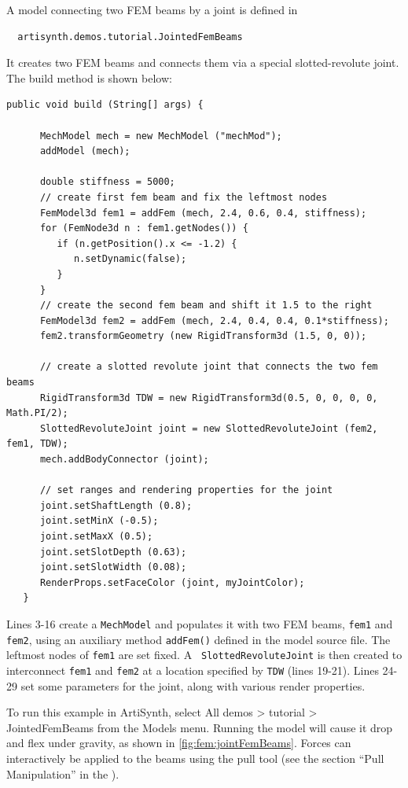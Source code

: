 A model connecting two FEM beams by a joint
is defined in
%
\begin{verbatim}
  artisynth.demos.tutorial.JointedFemBeams
\end{verbatim}
%
It creates two FEM beams and connects them via a special slotted-revolute
joint. The build method is shown below:
\lstset{numbers=left}
\begin{lstlisting}[]
   public void build (String[] args) {
      
      MechModel mech = new MechModel ("mechMod");
      addModel (mech);
      
      double stiffness = 5000;
      // create first fem beam and fix the leftmost nodes      
      FemModel3d fem1 = addFem (mech, 2.4, 0.6, 0.4, stiffness);
      for (FemNode3d n : fem1.getNodes()) {
         if (n.getPosition().x <= -1.2) {
            n.setDynamic(false);
         }
      }
      // create the second fem beam and shift it 1.5 to the right
      FemModel3d fem2 = addFem (mech, 2.4, 0.4, 0.4, 0.1*stiffness);
      fem2.transformGeometry (new RigidTransform3d (1.5, 0, 0));

      // create a slotted revolute joint that connects the two fem beams
      RigidTransform3d TDW = new RigidTransform3d(0.5, 0, 0, 0, 0, Math.PI/2);
      SlottedRevoluteJoint joint = new SlottedRevoluteJoint (fem2, fem1, TDW);
      mech.addBodyConnector (joint);
      
      // set ranges and rendering properties for the joint
      joint.setShaftLength (0.8);
      joint.setMinX (-0.5);
      joint.setMaxX (0.5);
      joint.setSlotDepth (0.63);
      joint.setSlotWidth (0.08);
      RenderProps.setFaceColor (joint, myJointColor);
   }
\end{lstlisting}
\lstset{numbers=none} Lines 3-16 create a {\tt MechModel} and
populates it with two FEM beams, {\tt fem1} and {\tt fem2}, using an
auxiliary method {\tt addFem()} defined in the model source file.  The
leftmost nodes of {\tt fem1} are set fixed. A {\tt
SlottedRevoluteJoint} is then created to interconnect {\tt fem1} and
{\tt fem2} at a location specified by {\tt TDW} (lines 19-21).  Lines
24-29 set some parameters for the joint, along with various render
properties.

To run this example in ArtiSynth, select {\sf All demos > tutorial >
JointedFemBeams} from the {\sf Models} menu. Running the model will
cause it drop and flex under gravity, as shown in 
\ref{fig:fem:jointFemBeams}. Forces can interactively
be applied to the beams using
the pull tool
(see the section ``Pull Manipulation'' in the
).

